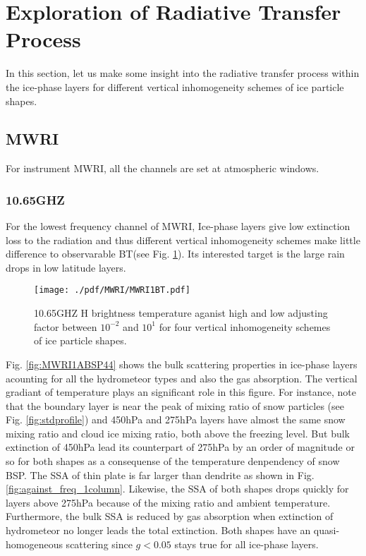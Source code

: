 \section{Exploration of Radiative Transfer Process}

In this section, let us make some insight into the radiative transfer process within the ice-phase layers for 
different vertical inhomogeneity schemes of ice particle shapes.

\subsection{MWRI}
For instrument MWRI, all the channels are set at atmospheric windows.

\subsubsection{10.65GHZ}
For the lowest frequency channel of MWRI, Ice-phase layers give low extinction loss to the radiation and thus different vertical inhomogeneity
schemes make little difference to observarable BT(see Fig. \ref{fig:MWRI1BT}). Its interested target is the large rain drops in low latitude layers.

\begin{figure}[hbtp] 
\centering
\texttt{[image: ./pdf/MWRI/MWRI1BT.pdf]}
\caption{10.65GHZ H brightness temperature aganist high and low adjusting factor between $10^{-2}$ and $10^{1}$ for four vertical 
inhomogeneity schemes of ice particle shapes.}
\label{fig:MWRI1BT}
\end{figure}

Fig. \ref{fig:MWRI1ABSP44} shows the bulk scattering properties in ice-phase layers acounting for all the hydrometeor types and also the
gas absorption. The vertical gradiant of temperature plays an significant role in this figure. For instance, note that the boundary layer is near 
the peak of mixing ratio of snow particles (see Fig. \ref{fig:stdprofile}) and 450hPa and 275hPa layers have almost the same snow mixing ratio 
and cloud ice mixing ratio, both above the freezing level. But bulk extinction of 450hPa lead its counterpart of 275hPa by an order of magnitude or so
for both shapes as a consequense of the temperature denpendency of snow BSP.
The SSA of thin plate is far larger than dendrite as shown in Fig. \ref{fig:against_freq_1column}. Likewise, the SSA of both shapes drops quickly
for layers above 275hPa because of the mixing ratio and ambient temperature. 
Furthermore, the bulk SSA is reduced by gas absorption when extinction of hydrometeor no longer leads the total extinction.
Both shapes have an quasi-homogeneous scattering since $g < 0.05$ stays true for all ice-phase layers.

